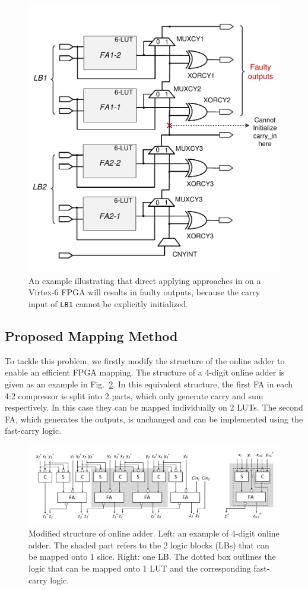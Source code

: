 \documentclass[conference]{IEEEtran}
\begin{document}
\begin{figure}[tbp]
	\centering
	\includegraphics[width=.45\textwidth]{./Figures/SDadder_FastCarry_PreviousWork.pdf}
	\caption{An example illustrating that direct applying approaches in \cite{FPT09RA} on a Virtex-6 FPGA will results in faulty outputs, because the carry input of \texttt{LB1} cannot be explicitly initialized.}
	\label{Fig:PreWorkVirtex6}
    \vspace{-2ex}
\end{figure}

\subsection{Proposed Mapping Method}
To tackle this problem, we firstly modify the structure of the online adder to enable an efficient FPGA mapping. The structure of a 4-digit online adder is given as an example in Fig.~\ref{Fig:ModifiedOA}. In this equivalent structure, the first FA in each 4:2 compressor is split into 2 parts, which only generate carry and sum respectively. In this case they can be mapped individually on 2 LUTs. The second FA, which generates the outputs, is unchanged and can be implemented using the fast-carry logic.



\begin{figure}[tbp]
	\centering
	\includegraphics[width=.85\textwidth]{./Figures/SDadder_FPGA_New_4digit.pdf}
	\caption{Modified structure of online adder. Left: an example of 4-digit online adder. The shaded part refers to the 2 logic blocks (LBs) that can be mapped onto 1 slice. Right: one LB. The dotted box outlines the logic that can be mapped onto 1 LUT and the corresponding fast-carry logic.}
	\label{Fig:ModifiedOA}
\end{figure}
\end{document}

